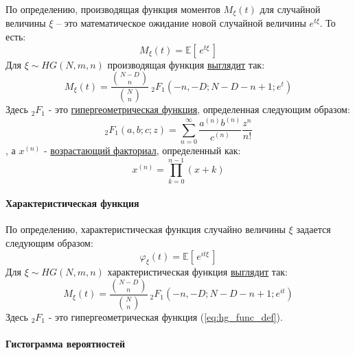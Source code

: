 \documentclass[
  russian,
  a4paper,
]{article}
\let\oldparagraph\paragraph
\renewcommand{\paragraph}[1]{\oldparagraph{#1}\mbox{}}
\begin{document}
По определению, производящая функция моментов \(M_\xi(t)\) для случайной
величины \(\xi\) -- это математическое ожидание новой случайной величины
\(e^{t\xi}\). То есть:
\begin{equation}M_\xi(t) = \mathbb{E}\left[\, e^{t\xi} \,\right]\label{eq:mgf_def}\end{equation}
Для \(\xi \sim HG(N, m, n)\) производящая функция
\href{https://ru.wikipedia.org/wiki/Гипергеометрическое_распределение}{выглядит}
так:
\begin{equation}M_\xi(t) = \frac{\binom{N-D}{n}}{\binom{N}{n}}\ {}_{2}F_{1}\left(-n, -D; N-D-n+1; e^t\right)\label{eq:hg_mgf}\end{equation}
Здесь \({}_{2}F_{1}\) - это
\href{https://en.wikipedia.org/wiki/Hypergeometric_function}{гипергеометрическая
функция}, определенная следующим образом:
\begin{equation}{}_{2}F_{1}(a,b;c;z) = \sum_{n=0}^{\infty} \frac{a^{(n)} b^{(n)}}{c^{(n)}} \frac{z^n}{n!}\label{eq:hg_func_def}\end{equation}
, а \(x^{(n)}\) -
\href{https://en.wikipedia.org/wiki/Falling_and_rising_factorials}{возрастающий
факториал}, определенный как: \[x^{(n)} = \prod_{k=0}^{n-1} (x + k)\]

\hypertarget{ux445ux430ux440ux430ux43aux442ux435ux440ux438ux441ux442ux438ux447ux435ux441ux43aux430ux44f-ux444ux443ux43dux43aux446ux438ux44f}{%
\paragraph{Характеристическая
функция}\label{ux445ux430ux440ux430ux43aux442ux435ux440ux438ux441ux442ux438ux447ux435ux441ux43aux430ux44f-ux444ux443ux43dux43aux446ux438ux44f}}

По определению, характеристическая функция случайно величины \(\xi\)
задается следующим образом:
\[\varphi_\xi (t) = \mathbb{E}\left[\, e^{it\xi} \,\right]\] Для
\(\xi \sim HG(N, m, n)\) характеристическая функция
\href{https://ru.wikipedia.org/wiki/Гипергеометрическое_распределение}{выглядит}
так:
\[M_\xi(t) = \frac{\binom{N-D}{n}}{\binom{N}{n}}\ {}_{2}F_{1}\left(-n, -D; N-D-n+1; e^{it}\right)\]
Здесь \({}_{2}F_{1}\) - это гипергеометрическая функция
(\ref{eq:hg_func_def}).

\hypertarget{ux433ux438ux441ux442ux43eux433ux440ux430ux43cux43cux430-ux432ux435ux440ux43eux44fux442ux43dux43eux441ux442ux435ux439}{%
\paragraph{Гистограмма
вероятностей}\label{ux433ux438ux441ux442ux43eux433ux440ux430ux43cux43cux430-ux432ux435ux440ux43eux44fux442ux43dux43eux441ux442ux435ux439}}
\end{document}
